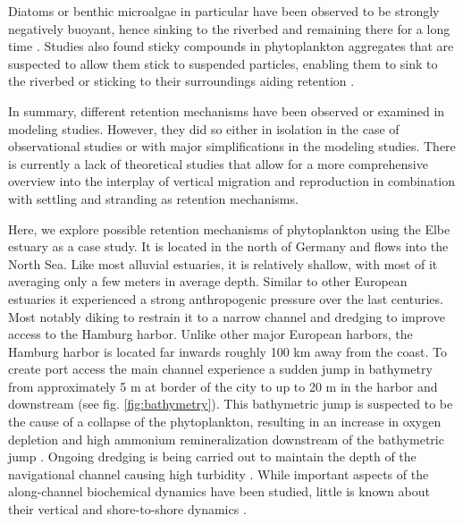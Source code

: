 \documentclass[npg, manuscript]{copernicus}
\begin{document}
Diatoms or benthic microalgae in particular have been observed to be strongly negatively buoyant, hence sinking to the riverbed and remaining there for a long time \citep{Passow1991,ThomasAnderson1998}.
Studies also found sticky compounds in phytoplankton aggregates that are suspected to allow them stick to suspended particles, enabling them to sink to the riverbed or sticking to their surroundings aiding retention \citep{Kiørboe1993,VanderLee2000}.

In summary, different retention mechanisms have been observed or examined in modeling studies.
However, they did so either in isolation in the case of observational studies or with major simplifications in the modeling studies.
There is currently a lack of theoretical studies that allow for a more comprehensive overview into the interplay of vertical migration and reproduction in combination with settling and stranding as retention mechanisms.


Here, we explore possible retention mechanisms of phytoplankton using the Elbe estuary as a case study.
It is located in the north of Germany and flows into the North Sea.
Like most alluvial estuaries, it is relatively shallow, with most of it averaging only a few meters in average depth.
Similar to other European estuaries it experienced a strong anthropogenic pressure over the last centuries.
Most notably diking to restrain it to a narrow channel and dredging to improve access to the Hamburg harbor.
Unlike other major European harbors, the Hamburg harbor is located far inwards roughly 100 \unit{km} away from the coast.
To create port access the main channel experience a sudden jump in bathymetry from approximately 5 \unit{m} at border of the city to up to 20 \unit{m} in the harbor and downstream (see fig. \ref{fig:bathymetry}). 
This bathymetric jump is suspected to be the cause of a collapse of the phytoplankton, resulting in an increase in oxygen depletion and high ammonium remineralization downstream of the bathymetric jump \citep{Schroeder1997,Holzwarth2018,Sanders2018}.
Ongoing dredging is being carried out to maintain the depth of the navigational channel causing high turbidity \citep{Kappenberg2001}.
While important aspects of the along-channel biochemical dynamics have been studied, little is known about their vertical and shore-to-shore dynamics \citep{Goosen1999, Dahnke2008, Sanders2018}.
\end{document}
